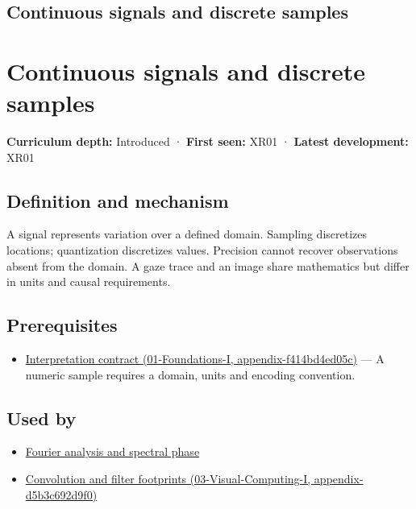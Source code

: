 \hypertarget{appendix-1077ea8fc737}{}
\section*{Continuous signals and discrete samples}
\chapter{Continuous signals and discrete samples}\label{appendix-1077ea8fc737-continuous-signals-and-discrete-samples}

\textbf{Curriculum depth:} Introduced · \textbf{First seen:} XR01 · \textbf{Latest development:} XR01

\section{Definition and mechanism}\label{appendix-1077ea8fc737-definition-and-mechanism}

A signal represents variation over a defined domain. Sampling discretizes locations; quantization discretizes values. Precision cannot recover observations absent from the domain. A gaze trace and an image share mathematics but differ in units and causal requirements.

\section{Prerequisites}\label{appendix-1077ea8fc737-prerequisites}

\begin{itemize}
\tightlist
\item
  \href{../01-Foundations-I/main.pdf\#nameddest=appendix-f414bd4ed05c}{Interpretation contract (01-Foundations-I, appendix-f414bd4ed05c)} --- A numeric sample requires a domain, units and encoding convention.
\end{itemize}

\section{Used by}\label{appendix-1077ea8fc737-used-by}

\begin{itemize}
\tightlist
\item
  \hyperref[appendix-b60686ba06a1]{Fourier analysis and spectral phase}
\item
  \href{../03-Visual-Computing-I/main.pdf\#nameddest=appendix-d5b3c692d9f0}{Convolution and filter footprints (03-Visual-Computing-I, appendix-d5b3c692d9f0)}
\end{itemize}

